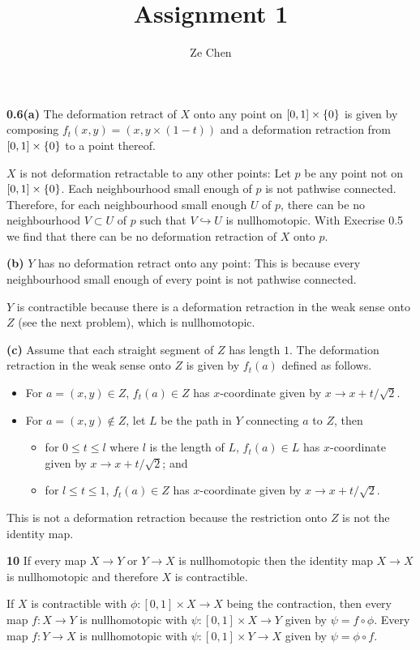 \documentclass{article}
\title{Assignment 1}
\author{Ze Chen}
\makeatletter
\newcommand*{\shifttext}[1]{%
  \settowidth{\@tempdima}{#1}%
  \hspace{-\@tempdima}#1%
}
\newcommand{\plabel}[1]{%
\shifttext{\textbf{#1}\quad}%
}
\makeatother
\begin{document}
\maketitle

\plabel{0.6(a)}%
The deformation retract of $X$ onto any point on $\qty[0,1] \times \qty{0}$ is given by composing $f_t(x,y) = (x, y\times(1-t))$ and a deformation retraction from $\qty[0,1] \times \qty{0}$ to a point thereof.
\par
$X$ is not deformation retractable to any other points:
Let $p$ be any point not on $\qty[0,1] \times \qty{0}$.
Each neighbourhood small enough of $p$ is not pathwise connected.
Therefore, for each neighbourhood small enough $U$ of $p$, there can be no neighbourhood $V\subset U$ of $p$ such that $V\hookrightarrow U$ is nullhomotopic.
With Execrise 0.5 we find that there can be no deformation retraction of $X$ onto $p$.

\plabel{(b)}%
$Y$ has no deformation retract onto any point: This is because every neighbourhood small enough of every point is not pathwise connected.
\par
$Y$ is contractible because there is a deformation retraction in the weak sense onto $Z$ (see the next problem), which is nullhomotopic.

\plabel{(c)}%
Assume that each straight segment of $Z$ has length $1$.
The deformation retraction in the weak sense onto $Z$ is given by $f_t(a)$ defined as follows.
\begin{itemize}
    \item For $a = (x,y)\in Z$, $f_t(a)\in Z$ has $x$-coordinate given by $x \rightarrow x + t/\sqrt{2}$.
    \item For $a = (x,y)\notin Z$, let $L$ be the path in $Y$ connecting $a$ to $Z$, then
    \begin{itemize}
        \item for $0\le t \le l$ where $l$ is the length of $L$, $f_t(a)\in L$ has $x$-coordinate given by $x \rightarrow x + t/\sqrt{2}$; and
        \item for $l\le t \le 1$, $f_t(a)\in Z$ has $x$-coordinate given by $x \rightarrow x + t/\sqrt{2}$.
    \end{itemize}
\end{itemize}
This is not a deformation retraction because the restriction onto $Z$ is not the identity map.

\plabel{10}%
If every map $X\rightarrow Y$ or $Y\rightarrow X$ is nullhomotopic then the identity map $X\rightarrow X$ is nullhomotopic and therefore $X$ is contractible.
\par
If $X$ is contractible with $\phi: [0,1] \times X\rightarrow X$ being the contraction, then every map $f:X\rightarrow Y$ is nullhomotopic with $\psi: [0,1] \times X \rightarrow Y$ given by $\psi = f \circ \phi$.
Every map $f:Y \rightarrow X$ is nullhomotopic with $\psi: [0,1] \times Y \rightarrow X$ given by $\psi = \phi \circ f$.
\end{document}
